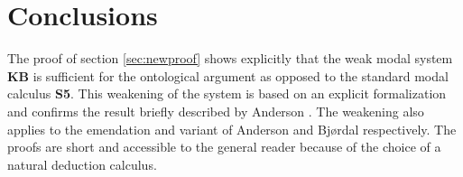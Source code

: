 \documentclass[smallextended]{svjour3}
\begin{document}

\section{Conclusions}

The proof of section \ref{sec:newproof} shows explicitly that the weak modal system {\bf KB} is sufficient for the ontological argument as opposed to the standard modal calculus {\bf S5}. This weakening of the system is based on an explicit formalization and confirms the result briefly described by Anderson \citep[footnote 2]{and90}. The weakening also applies to the emendation and variant of Anderson and Bj\o rdal respectively. The proofs are short and accessible to the general reader because of the choice of a natural deduction calculus. 
\end{document}
